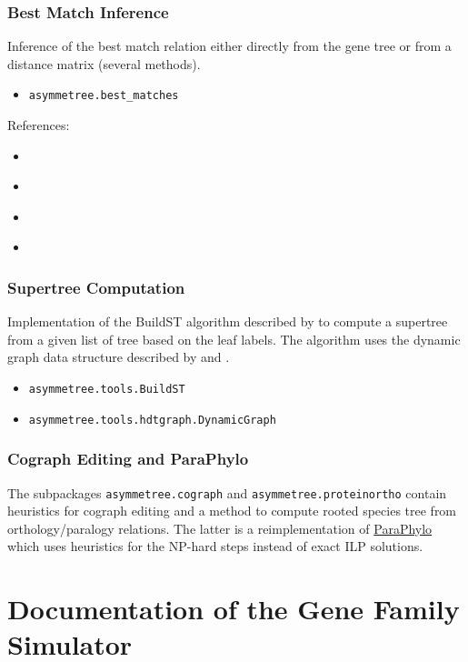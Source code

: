 \documentclass[hidelinks,11pt]{scrreprt}
\begin{document}
\subsection{Best Match Inference}

Inference of the best match relation either directly from the gene tree or from a distance matrix (several methods).
\begin{itemize}
	\item \texttt{asymmetree.best\_matches}
\end{itemize}

References:
\begin{itemize}
	\item \citet{geiss2019a}
	\item \citet{geiss2020b}
	\item \citet{geiss2020c}
	\item \citet{stadler2020}
\end{itemize}

\subsection{Supertree Computation}

Implementation of the BuildST algorithm described by \citet{deng2016} to compute a supertree from a given list of tree based on the leaf labels. The algorithm uses the dynamic graph data structure described by \citet{henzinger1995} and \citet{holm2001}.
\begin{itemize}
	\item \texttt{asymmetree.tools.BuildST}
	\item \texttt{asymmetree.tools.hdtgraph.DynamicGraph}
\end{itemize}


\subsection{Cograph Editing and ParaPhylo}

The subpackages \texttt{asymmetree.cograph} and \texttt{asymmetree.proteinortho} contain heuristics for cograph editing and a method to compute rooted species tree from orthology/paralogy relations.
The latter is a reimplementation of \href{http://pacosy.informatik.uni-leipzig.de/208-0-ParaPhylo.html}{ParaPhylo} \citep{hellmuth2015} which uses heuristics for the NP-hard steps instead of exact ILP solutions.




\chapter{Documentation of the Gene Family Simulator}\label{sec:doc}
\end{document}
